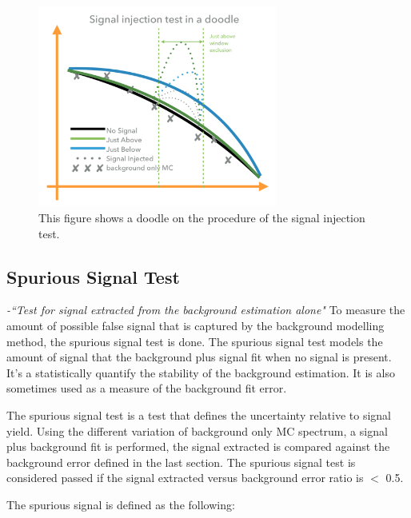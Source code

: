\begin{figure}[!htb]
    \begin{center}
        \includegraphics[width=0.7\textwidth]{figures/chapter_analysismethod/SignalInjectionTest}
        \caption{
            This figure shows a doodle on the procedure of the signal injection test.
        }
        \label{signalinjection}
    \end{center}
\end{figure}
\FloatBarrier

    \subsection{Spurious Signal Test} 

    \label{sec:spurious}

    \textit{-``Test for signal extracted from the background estimation alone"}
    To measure the amount of possible false signal that is captured by the background modelling method, the spurious signal test is done. The spurious signal test models the amount of signal that the background plus signal fit when no signal is present.  It's a statistically quantify the stability of the background estimation. It is also sometimes used as a measure of the background fit error.

The spurious signal test is a test that defines the uncertainty relative to signal yield. Using the different variation of background only MC spectrum, a signal plus background fit is performed, the signal extracted is compared against the background error defined in the last section. The spurious signal test is considered passed if the signal extracted versus background error ratio is $<$ 0.5.

    The spurious signal is defined as the following:
    
